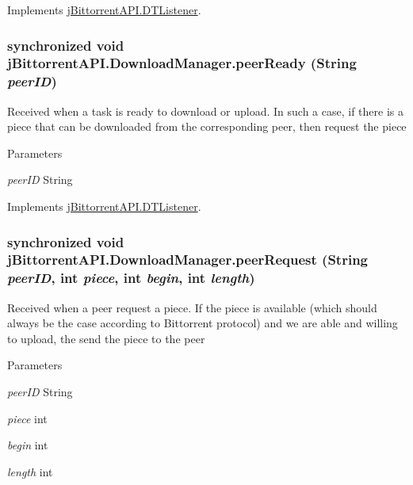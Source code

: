 Implements \hyperlink{interfacej_bittorrent_a_p_i_1_1_d_t_listener}{jBittorrentAPI.DTListener}.\hypertarget{classj_bittorrent_a_p_i_1_1_download_manager_a5a0a15af5eee295adb93fa5f218bbfc3}{
\subsubsection[{peerReady}]{\setlength{\rightskip}{0pt plus 5cm}synchronized void jBittorrentAPI.DownloadManager.peerReady (String {\em peerID})}}
\label{classj_bittorrent_a_p_i_1_1_download_manager_a5a0a15af5eee295adb93fa5f218bbfc3}
Received when a task is ready to download or upload. In such a case, if there is a piece that can be downloaded from the corresponding peer, then request the piece 
\begin{DoxyParams}{Parameters}
\item[{\em peerID}]String \end{DoxyParams}


Implements \hyperlink{interfacej_bittorrent_a_p_i_1_1_d_t_listener}{jBittorrentAPI.DTListener}.\hypertarget{classj_bittorrent_a_p_i_1_1_download_manager_a0640ab4a739aac77045c288a26118a0c}{
\subsubsection[{peerRequest}]{\setlength{\rightskip}{0pt plus 5cm}synchronized void jBittorrentAPI.DownloadManager.peerRequest (String {\em peerID}, \/  int {\em piece}, \/  int {\em begin}, \/  int {\em length})}}
\label{classj_bittorrent_a_p_i_1_1_download_manager_a0640ab4a739aac77045c288a26118a0c}
Received when a peer request a piece. If the piece is available (which should always be the case according to Bittorrent protocol) and we are able and willing to upload, the send the piece to the peer 
\begin{DoxyParams}{Parameters}
\item[{\em peerID}]String \item[{\em piece}]int \item[{\em begin}]int \item[{\em length}]int \end{DoxyParams}


